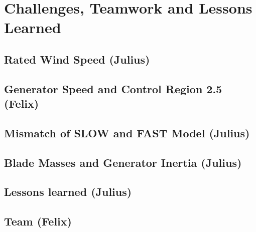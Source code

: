 \chapter{Challenges, Teamwork and Lessons Learned} \label{Challenges}
\section{Rated Wind Speed (Julius)} \label{RatedWindSpeed}


\section{Generator Speed and Control Region 2.5 (Felix)} \label{Region2d5}


\section{Mismatch of SLOW and FAST Model (Julius)}


\section{Blade Masses and Generator Inertia (Julius)}


\section{Lessons learned (Julius)}


\section{Team (Felix)}



